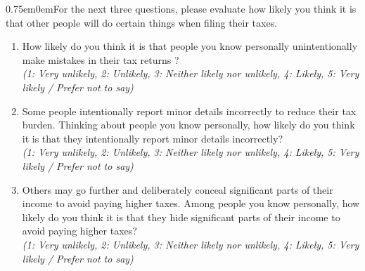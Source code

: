 \documentclass[11pt]{article}
\begin{document}
\vspace{0.5em} 
\begin{adjustwidth}{0.75em}{0em}For the next three questions, please evaluate how likely you think it is that other people will do certain things when filing their taxes.\end{adjustwidth}
\begin{enumerate}[resume]
    \item How likely do you think it is that people you know personally unintentionally make mistakes in their tax returns ? \\
    \textit{(1: Very unlikely, 2: Unlikely, 3: Neither likely nor unlikely, 4: Likely, 5: Very likely
 / Prefer not to say)}
    \item Some people intentionally report minor details incorrectly to reduce their tax burden. Thinking about people you know personally, how likely do you think it is that they intentionally report minor details incorrectly?\\
    \textit{(1: Very unlikely, 2: Unlikely, 3: Neither likely nor unlikely, 4: Likely, 5: Very likely
 / Prefer not to say)}
    \item Others may go further and deliberately conceal significant parts of their income to avoid paying higher taxes. Among people you know personally, how likely do you think it is that they hide significant parts of their income to avoid paying higher taxes?\\
    \textit{(1: Very unlikely, 2: Unlikely, 3: Neither likely nor unlikely, 4: Likely, 5: Very likely
 / Prefer not to say)}
\end{enumerate}
\end{document}
